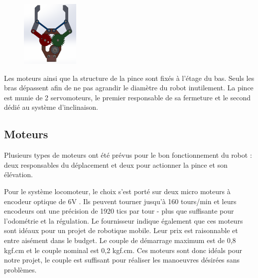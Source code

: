\documentclass[a4paper,11pt]{article}
\begin{document}
\begin{figure}[H]
\begin{minipage}[c]{.46\linewidth}
        \includegraphics[height = 120]{pince_ouv.png}
    \end{minipage}
\end{figure}

Les moteurs ainsi que la structure de la pince sont fixés à l'étage du bas. Seuls les bras dépassent afin de ne pas agrandir le diamètre du robot inutilement. La pince est munie de 2 servomoteurs, le premier responsable de sa fermeture et le second dédié au système d'inclinaison.

\subsection{Moteurs}

Plusieurs types de moteurs ont été prévus pour le bon fonctionnement du robot : deux responsables du déplacement et deux pour actionner la pince et son élévation.

Pour le système locomoteur, le choix s'est porté sur deux micro moteurs à encodeur optique de 6V \cite{moteur_encodeur}. Ils peuvent tourner jusqu'à 160 tours/min et leurs encodeurs ont une précision de 1920 tics par tour - plus que suffisante pour l'odométrie et la régulation. Le fournisseur indique également que ces moteurs sont idéaux pour un projet de robotique mobile. Leur prix est raisonnable et entre aisément dans le budget. Le couple de démarrage maximum est de 0,8 kgf.cm et le couple nominal est 0,2 kgf.cm. Ces moteurs sont donc idéals pour notre projet, le couple est suffisant pour réaliser les manoeuvres désirées sans problèmes.
\end{document}
